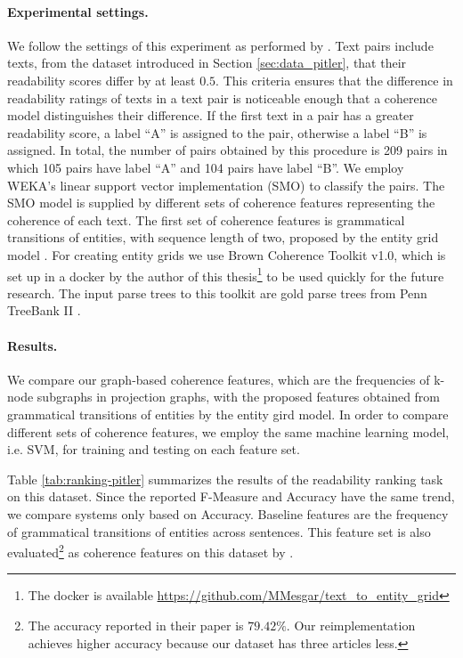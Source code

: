 \paragraph{Experimental settings.}
%
We follow the settings of this experiment as performed by . 
Text pairs include texts, from the dataset introduced in Section \ref{sec:data_pitler}, that their readability scores differ by at least $0.5$. 
This criteria ensures that the difference in readability ratings of texts in a text pair is noticeable enough that a coherence model distinguishes their difference. 
If the first text in a pair has a greater readability score, a label ``A'' is assigned to the pair, otherwise a label ``B'' is assigned. 
In total, the number of pairs obtained by this procedure is 209 pairs in which 105 pairs have label ``A''  and 104 pairs have label ``B''.  
We employ WEKA's linear support vector implementation (SMO) to classify the pairs.
The SMO model is supplied by different sets of coherence features representing the coherence of each text. 
The first set of coherence features is grammatical transitions of entities, with sequence length of two, proposed by the entity grid model \cite{barzilay05a,barzilay08}. 
For creating entity grids we use Brown Coherence Toolkit v1.0, which is set up in a docker by the author of this thesis\footnote{The docker is available \url{https://github.com/MMesgar/text_to_entity_grid}} to be used quickly for the future research. 
The input parse trees to this toolkit are gold parse trees from Penn TreeBank II \cite{marcus94}. 

\paragraph{Results.}
%
We compare our graph-based coherence features, which are the frequencies of \mbox{k-node} subgraphs in projection graphs, with the proposed features obtained from grammatical transitions of entities by the entity gird model. 
In order to compare different sets of coherence features, we employ the same machine learning model, i.e. SVM, for training and testing on each feature set. 

Table \ref{tab:ranking-pitler} summarizes the results of the readability ranking task on this dataset. 
Since the reported F-Measure and Accuracy have the same trend, we compare systems only based on Accuracy.  
Baseline features are the frequency of grammatical transitions of entities across sentences. 
This feature set is also evaluated\footnote{The accuracy reported in their paper is $79.42\%$. Our reimplementation achieves higher accuracy because our dataset has three articles less.} as coherence features on this dataset by .

